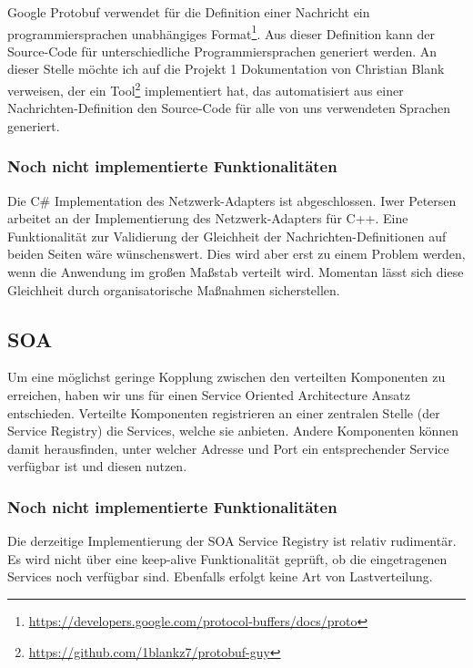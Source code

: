 Google Protobuf verwendet für die Definition einer Nachricht ein programmiersprachen unabhängiges Format\footnote{\url{https://developers.google.com/protocol-buffers/docs/proto}}. Aus dieser Definition kann der Source-Code für unterschiedliche Programmiersprachen generiert werden. An dieser Stelle möchte ich auf die Projekt 1 Dokumentation von Christian Blank verweisen, der ein Tool\footnote{\url{https://github.com/1blankz7/protobuf-guy}} implementiert hat, das automatisiert aus einer Nachrichten-Definition den Source-Code für alle von uns verwendeten Sprachen generiert.

\subsubsection{Noch nicht implementierte Funktionalitäten}

Die C\# Implementation des Netzwerk-Adapters ist abgeschlossen. Iwer Petersen arbeitet an der Implementierung des Netzwerk-Adapters für C++. Eine Funktionalität zur Validierung der Gleichheit der Nachrichten-Definitionen auf beiden Seiten wäre wünschenswert. Dies wird aber erst zu einem Problem werden, wenn die Anwendung im großen Maßstab verteilt wird. Momentan lässt sich diese Gleichheit durch organisatorische Maßnahmen sicherstellen.

\subsection{SOA}


Um eine möglichst geringe Kopplung zwischen den verteilten Komponenten zu erreichen, haben wir uns für einen Service Oriented Architecture Ansatz entschieden. Verteilte Komponenten registrieren an einer zentralen Stelle (der Service Registry) die Services, welche sie anbieten. Andere Komponenten können damit herausfinden, unter welcher Adresse und Port ein entsprechender Service verfügbar ist und diesen nutzen.

\subsubsection{Noch nicht implementierte Funktionalitäten}

Die derzeitige Implementierung der SOA Service Registry ist relativ rudimentär. Es wird nicht über eine keep-alive Funktionalität geprüft, ob die eingetragenen Services noch verfügbar sind. Ebenfalls erfolgt keine Art von Lastverteilung. 